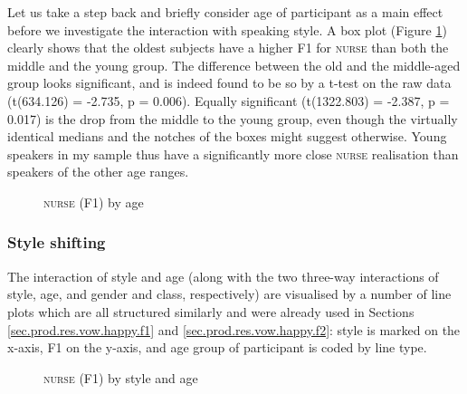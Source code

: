 Let us take a step back and briefly consider age of participant as a main effect before we investigate the interaction with speaking style.
A box plot (Figure \ref{fig.box.f1.nurse.tot}) clearly shows that the oldest subjects have a higher F1 for \textsc{nurse} than both the middle and the young group.
The difference between the old and the middle-aged group looks significant, and is indeed found to be so by a t-test on the raw data (t(634.126) = -2.735, p = 0.006).
Equally significant (t(1322.803) = -2.387, p = 0.017) is the drop from the middle to the young group, even though the virtually identical medians and the notches of the boxes might suggest otherwise.
Young speakers in my sample thus have a significantly more close \textsc{nurse} realisation than speakers of the other age ranges.

\begin{figure}[h!]
	\centering
		\resizebox{0.5\linewidth}{!}{} 
	\caption{\textsc{nurse} (F1) by age}
	\label{fig.box.f1.nurse.tot}
\end{figure}

\subsubsection{Style shifting}
\label{sec.prod.res.vow.nurse.f1.shifting}

The interaction of style and age (along with the two three-way interactions of style, age, and gender and class, respectively) are visualised by a number of line plots which are all structured similarly and were already used in Sections \ref{sec.prod.res.vow.happy.f1} and \ref{sec.prod.res.vow.happy.f2}: style is marked on the x-axis, F1 on the y-axis, and age group of participant is coded by line type.

\begin{figure}[h!]
	\centering
		\resizebox{0.5\linewidth}{!}{} 
	\caption{\textsc{nurse} (F1) by style and age}
	\label{fig.line.f1.nurse.tot}
\end{figure}

